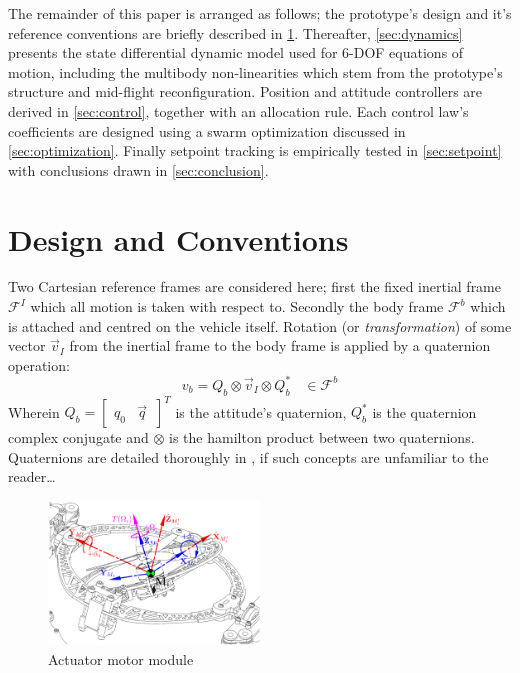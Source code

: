 \documentclass[a4paper, 10pt, conference]{ieeeconf}
\begin{document}
\par
The remainder of this paper is arranged as follows; the prototype's design and it's reference conventions are briefly described in \ref{sec:design}. Thereafter, \ref{sec:dynamics} presents the state differential dynamic model used for 6-DOF equations of motion, including the multibody non-linearities which stem from the prototype's structure and mid-flight reconfiguration. Position and attitude controllers are derived in \ref{sec:control}, together with an allocation rule. Each control law's coefficients are designed using a swarm optimization discussed in \ref{sec:optimization}. Finally setpoint tracking is empirically tested in \ref{sec:setpoint} with conclusions drawn in \ref{sec:conclusion}.
\section{Design and Conventions} 
\label{sec:design}
Two Cartesian reference frames are considered here; first the fixed inertial frame $\mathcal{F}^{I}$ which all motion is taken with respect to. Secondly the body frame $\mathcal{F}^{b}$ which is attached and centred on the vehicle itself. Rotation (or \emph{transformation}) of some vector $\vec{v}_I$ from the inertial frame to the body frame is applied by a quaternion operation:
\begin{equation}\label{eq:quaternion-operation}
v_b=Q_b\otimes \vec{v}_I \otimes Q_b^*~~~~\in\mathcal{F}^{b}
\end{equation}
Wherein $Q_b=\begin{bmatrix}q_0 & \vec{q}\hspace{2pt}\end{bmatrix}^T$ is the attitude's quaternion, $Q_b^*$ is the quaternion complex conjugate and $\otimes$ is the hamilton product between two quaternions. Quaternions are detailed thoroughly in \cite{shoemaker}, if such concepts are unfamiliar to the 
reader\ldots
\par
\begin{figure}[tbp]
\centering
\includegraphics[width=0.5\textwidth]{figs/force-redirect}
\vspace{-20pt}
\caption{Actuator motor module}
\label{fig:force-redirect}
\vspace{-16pt}
\end{figure}
\end{document}
